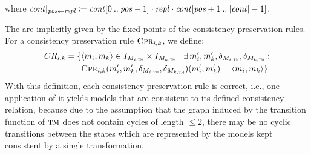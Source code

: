 where $\mathit{cont}|_{\mathit{pos} \gets \mathit{repl}} \coloneqq \mathit{cont}[0\:..\:\mathit{pos}-1] \cdot \mathit{repl} \cdot \mathit{cont}[\mathit{pos}+1\:..\:|\mathit{cont}|-1]$.

The \modellevelconsistencyrelations are implicitly given by the fixed points of the consistency preservation rules.
For a consistency preservation rule $\textsc{Cpr}_{i,k}$, we define:
\begin{align*}
    \consistencyrelation{CR}{i,k} = \setted{
    & 
    \tupled{\model{m}{i}, \model{m}{k}} \in \metamodelinstanceset{M}{i,\TuringMachine} \times \metamodelinstanceset{M}{k,\TuringMachine} \mid 
    \exists \model{m}{i}', \model{m}{k}', \change{\metamodel{M}{i,\TuringMachine}}, \change{\metamodel{M}{k,\TuringMachine}} : \\
    & 
    \consistencypreservationrule{i,k}(\model{m}{i}',\model{m}{k}',\change{\metamodel{M}{i,\TuringMachine}}, \change{\metamodel{M}{k,\TuringMachine}})(\model{m}{i}',\model{m}{k}') = \tupled{\model{m}{i}, \model{m}{k}}}
\end{align*} 
With this definition, each consistency preservation rule is correct, i.e., one application of it yields models that are consistent to its defined consistency relation, because due to the assumption that the graph induced by the transition function of $\textsc{tm}$ does not contain cycles of length $\leq 2$, there may be no cyclic transitions between the states which are represented by the models kept consistent by a single transformation.

